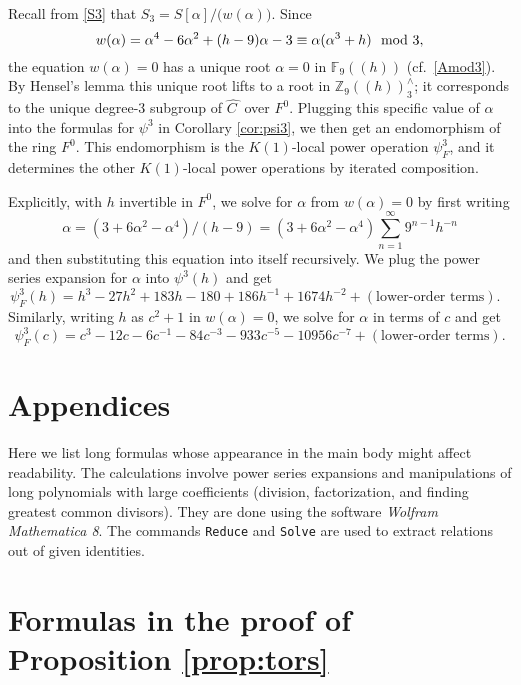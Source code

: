 \documentclass{gtpart}
\theoremstyle{definition}
\theoremstyle{remark}
\newcommand{\mb}[1]{\mathbb{#1}}
\newcommand{\BF}{{\mb F}}
\newcommand{\BZ}{{\mb Z}}
\newcommand{\HC}{\widehat{C~}\!}
\newcommand{\md}{~~{\rm mod}~}
\newcommand{\A}{\alpha}
\newcommand{\p}{\psi^3}
\numberwithin{equation}{section}
\numberwithin{thm}{section}
\begin{document}
Recall from \eqref{S3} that $S_3 = S[\A] \big/ \big( w(\A) \big)$.  
Since 
\[
 w(\A) = \A^4 - 6 \A^2 + (h - 9) \A - 3 \equiv \A (\A^3 + h) \md 3, 
\]
the equation $w(\A) = 0$ has a unique root $\A = 0$ in $\BF_9 (\!(h)\!)$ 
(cf.~\eqref{Amod3}).  By Hensel's lemma this unique root lifts to a root 
in $\BZ_9 (\!(h)\!)_3^\wedge$; it corresponds to the unique degree-3 
subgroup of $\HC$ over $F^0$.  Plugging this specific value of $\A$ into 
the formulas for $\p$ in Corollary \ref{cor:psi3}, we then get an 
endomorphism of the ring $F^0$.  This endomorphism is the $K(1)$-local 
power operation $\psi_F^3$, and it determines the other $K(1)$-local 
power operations by iterated composition.  

Explicitly, with $h$ invertible in $F^0$, we solve for $\A$ from 
$w(\A) = 0$ by first writing 
\[
 \A = (3 + 6 \A^2 - \A^4) / (h - 9) 
 = (3 + 6 \A^2 - \A^4) \sum_{n = 1}^\infty 9^{n-1} h^{-n} 
\]
and then substituting this equation into itself recursively.  We plug 
the power series expansion for $\A$ into $\p(h)$ and get 
\[
 \psi_F^3(h) = h^3 - 27 h^2 + 183 h - 180 + 186 h^{-1} + 1674 h^{-2} 
 + (\text{lower-order terms}).  ~~~
\]
Similarly, writing $h$ as $c^2 + 1$ in $w(\A) = 0$, we solve for $\A$ in 
terms of $c$ and get 
\[
 \psi_F^3(c) = c^3 - 12 c - 6 c^{-1} - 84 c^{-3} - 933 c^{-5} 
 - 10956 c^{-7} + (\text{lower-order terms}).  
\]


\newpage
\appendix
\section*{Appendices}

Here we list long formulas whose appearance in the main body might 
affect readability.  The calculations involve power series expansions 
and manipulations of long polynomials with large coefficients (division, 
factorization, and finding greatest common divisors).  They are done 
using the software {\em Wolfram Mathematica 8}.  The commands 
\texttt{Reduce} and \texttt{Solve} are used to extract relations out of 
given identities.  


\section{Formulas in the proof of Proposition \ref{prop:tors}}
\label{apx:tors}
\end{document}

